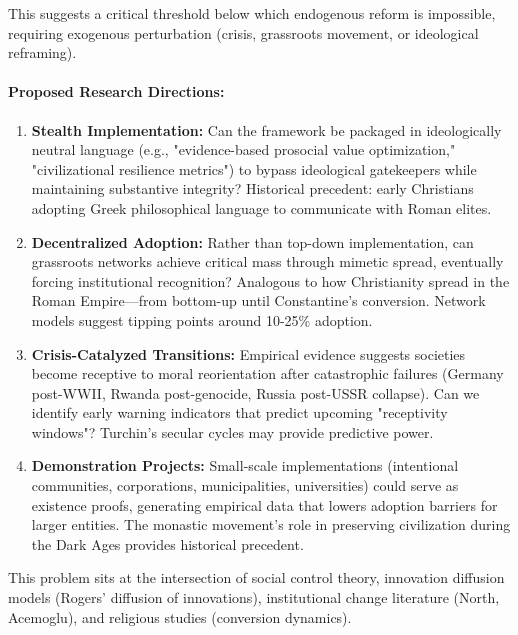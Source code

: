 \documentclass[11pt,a4paper]{article}
\theoremstyle{definition}
\theoremstyle{remark}
\begin{document}
This suggests a critical threshold below which endogenous reform is impossible, requiring exogenous perturbation (crisis, grassroots movement, or ideological reframing).

\paragraph{Proposed Research Directions:}
\begin{enumerate}
    \item \textbf{Stealth Implementation:} Can the framework be packaged in ideologically neutral language (e.g., "evidence-based prosocial value optimization," "civilizational resilience metrics") to bypass ideological gatekeepers while maintaining substantive integrity? Historical precedent: early Christians adopting Greek philosophical language to communicate with Roman elites.
    
    \item \textbf{Decentralized Adoption:} Rather than top-down implementation, can grassroots networks achieve critical mass through mimetic spread, eventually forcing institutional recognition? Analogous to how Christianity spread in the Roman Empire—from bottom-up until Constantine's conversion. Network models suggest tipping points around 10-25\% adoption.
    
    \item \textbf{Crisis-Catalyzed Transitions:} Empirical evidence suggests societies become receptive to moral reorientation after catastrophic failures (Germany post-WWII, Rwanda post-genocide, Russia post-USSR collapse). Can we identify early warning indicators that predict upcoming "receptivity windows"? Turchin's secular cycles may provide predictive power.
    
    \item \textbf{Demonstration Projects:} Small-scale implementations (intentional communities, corporations, municipalities, universities) could serve as existence proofs, generating empirical data that lowers adoption barriers for larger entities. The monastic movement's role in preserving civilization during the Dark Ages provides historical precedent.
\end{enumerate}

This problem sits at the intersection of social control theory, innovation diffusion models (Rogers' diffusion of innovations), institutional change literature (North, Acemoglu), and religious studies (conversion dynamics).
\end{document}
